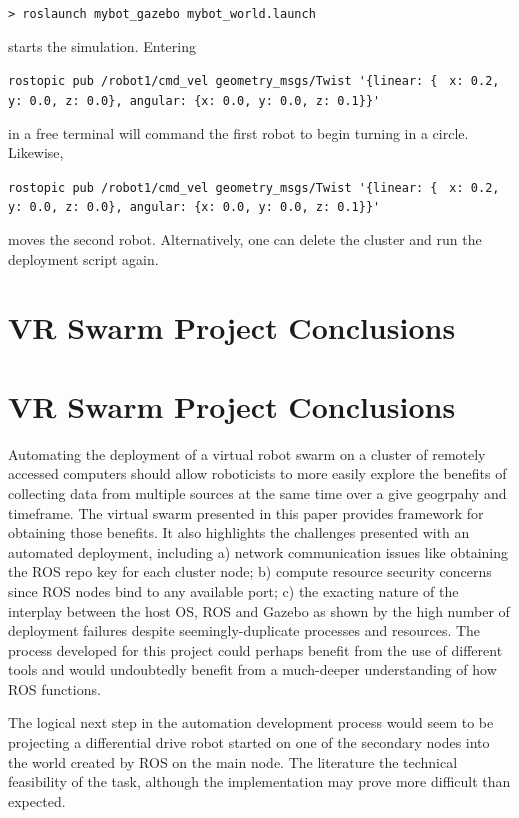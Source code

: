 \documentclass[9pt,twocolumn,twoside]{../../styles/osajnl}
\begin{document}
 {\lstinline[style=BashInputStyle]!> roslaunch mybot_gazebo mybot_world.launch! } 

\parindent0pt starts the simulation.  Entering 

{\lstinline[style=BashInputStyle]!rostopic pub /robot1/cmd_vel geometry_msgs/Twist '{linear: { !} {\lstinline[style=BashInputStyle]!x: 0.2, y: 0.0, z: 0.0}, angular: {x: 0.0, y: 0.0, z: 0.1}}'! }

\parindent0pt in a free terminal will command the first robot to begin turning in a circle.  Likewise, 

{\lstinline[style=BashInputStyle]!rostopic pub /robot1/cmd_vel geometry_msgs/Twist '{linear: { !} {\lstinline[style=BashInputStyle]!x: 0.2, y: 0.0, z: 0.0}, angular: {x: 0.0, y: 0.0, z: 0.1}}'! }

moves the second robot. Alternatively, one can delete the cluster and run the deployment script again.


\section{VR Swarm Project Conclusions}

\section{VR Swarm Project Conclusions}
Automating the deployment of a virtual robot swarm on a cluster of remotely accessed computers should allow roboticists to more easily explore the benefits of collecting data from multiple sources at the same time over a give geogrpahy and timeframe.  The virtual swarm presented in this paper provides framework for obtaining those benefits. It also highlights the challenges presented with an automated deployment, including a) network communication issues like obtaining the ROS repo key for each cluster node; b) compute resource security concerns since ROS nodes bind to any available port; c) the exacting nature of the interplay between the host OS, ROS and Gazebo as shown by the high number of deployment failures despite seemingly-duplicate processes and resources.  The process developed for this project could perhaps benefit from the use of different tools and would undoubtedly benefit from a much-deeper understanding of how ROS functions.

The logical next step in the automation development process would seem to be projecting a differential drive robot started on one of the secondary nodes into the world created by ROS on the main node.  The literature the technical feasibility of the task, although the implementation may prove more difficult than expected.
\end{document}
